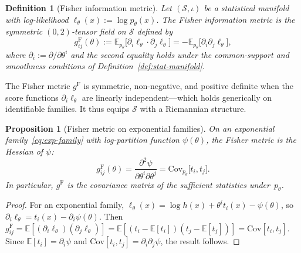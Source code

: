 \documentclass[11pt]{article}
\newcommand{\E}{\mathbb{E}}
\newcommand{\Cov}{\mathrm{Cov}}
\newcommand{\gF}{g^{\mathrm{F}}}
\newtheorem{definition}{Definition}
\newtheorem{proposition}{Proposition}
\theoremstyle{remark}
\begin{document}
\begin{definition}[Fisher information metric]\label{def:fisher-metric}
Let $(\mathcal{S}, \iota)$ be a statistical manifold with log-likelihood
$\ell_\theta(x) := \log p_\theta(x)$.  The \emph{Fisher information metric} is
the symmetric $(0,2)$-tensor field on $\mathcal{S}$ defined by
\begin{equation}\label{eq:fisher-metric}
\gF_{ij}(\theta)
:= \E_{p_\theta}\!\bigl[\partial_i \ell_\theta \cdot \partial_j \ell_\theta\bigr]
= -\E_{p_\theta}\!\bigl[\partial_i \partial_j \ell_\theta\bigr],
\end{equation}
where $\partial_i := \partial / \partial\theta^i$ and the second equality holds
under the common-support and smoothness conditions of
Definition~\ref{def:stat-manifold}.
\end{definition}

The Fisher metric $\gF$ is symmetric, non-negative, and positive definite when
the score functions $\partial_i \ell_\theta$ are linearly independent---which
holds generically on identifiable families.  It thus equips $\mathcal{S}$ with
a Riemannian structure.

\begin{proposition}[Fisher metric on exponential families]
\label{prop:fisher-exp-family}
On an exponential family~\eqref{eq:exp-family} with log-partition function
$\psi(\theta)$, the Fisher metric is the Hessian of $\psi$:
\begin{equation}\label{eq:fisher-hessian}
\gF_{ij}(\theta) = \frac{\partial^2 \psi}{\partial\theta^i \partial\theta^j}
= \Cov_{p_\theta}\!\bigl[t_i, t_j\bigr].
\end{equation}
In particular, $\gF$ is the covariance matrix of the sufficient statistics
under~$p_\theta$.
\end{proposition}

\begin{proof}
For an exponential family,
$\ell_\theta(x) = \log h(x) + \theta^i t_i(x) - \psi(\theta)$, so
$\partial_i \ell_\theta = t_i(x) - \partial_i \psi(\theta)$.  Then
$\gF_{ij} = \E[(\partial_i \ell_\theta)(\partial_j \ell_\theta)]
= \E[(t_i - \E[t_i])(t_j - \E[t_j])]
= \Cov[t_i, t_j]$.  Since
$\E[t_i] = \partial_i \psi$ and
$\Cov[t_i, t_j] = \partial_i \partial_j \psi$, the result follows.
\end{proof}
\end{document}
